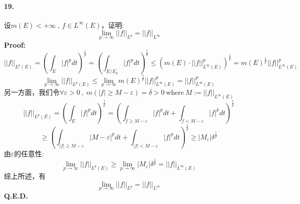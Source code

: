 \paragraph*{19.}设$m(E)<+\infty \ , \ f \in L^{\infty}(E)$，证明:
\[\lim_{p \to \infty}||f||_{L^p}=||f||_{L^{\infty}}\]
\textbf{Proof:}
\[||f||_{L^p(E)}=\left(\int_E|f|^pdt\right)^{\frac{1}{p}}=\left(\int_{E/E_0}|f|^pdt\right)^{\frac{1}{p}} \leq \left(m(E) \cdot ||f||^p_{L^{\infty}(E)}\right)^{\frac{1}{p}}=m(E)^{\frac{1}{p}}||f||^p_{L^{\infty}(E)}\]
\[\lim_{p \to \infty}||f||_{L^p(E)} \leq \lim_{p \to \infty}m(E)^{\frac{1}{p}}||f||^p_{L^{\infty}(E)}=||f||^p_{L^{\infty}(E)}\]
另一方面，我们令$\forall \varepsilon>0 \ , \ m(|f| \geq M-\varepsilon)=\delta>0 \ \text{where} \ M:=||f||_{L^{\infty}(E)}$
\[||f||_{L^p(E)}=\left(\int_E|f|^pdt\right)^{\frac{1}{p}}=\left(\int_{f \geq M-\varepsilon}|f|^pdt+\int_{f<M-\varepsilon}|f|^pdt\right)^{\frac{1}{p}}\]
\[\geq \left(\int_{|f| \geq M-\varepsilon}|M-\varepsilon|^pdt+\int_{|f|<M-\varepsilon}|f|^pdt\right)^{\frac{1}{p}} \geq |M_\varepsilon|\delta^{\frac{1}{p}}\]
由$\varepsilon$的任意性:
\[\lim_{p \to \infty}||f||_{L^p(E)} \geq \lim_{p \to \infty} |M_\varepsilon|\delta^{\frac{1}{p}}=||f||_{L^{\infty}(E)}\]
综上所述，有
\[\lim_{p \to \infty}||f||_{L^p}=||f||_{L^{\infty}}\]
\textbf{Q.E.D.}